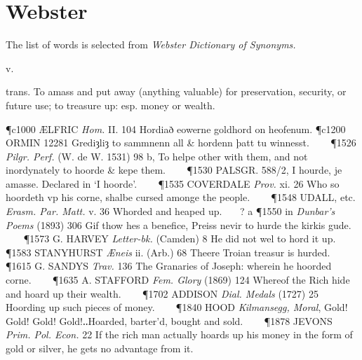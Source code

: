 \chapter*{Webster}
%


\noindent The list of words is selected from \textit{Webster Dictionary of Synonyms.}

\begin{description}[wide, labelwidth=!, labelindent=0pt] %

 v.

\noindent {}

\vspace{-0.3cm}

\begin{myenumerate}

 trans. To amass and put away (anything valuable) for preservation, security, or future use; to treasure up: esp. money or wealth.

\P c1000 ÆLFRIC  \textit{Hom.} II. 104 Hordiað eowerne goldhord on heofenum.
\P c1200 ORMIN  12281 Grediȝliȝ to sammnenn all \& hordenn þatt tu winnesst.    
\P 1526  \textit{Pilgr. Perf.} (W. de W. 1531) 98 b, To helpe other with them, and not inordynately to hoorde \& kepe them.    
\P 1530 PALSGR. 588/2, I hourde, je amasse. Declared in ‘I hoorde’.    
\P 1535 COVERDALE  \textit{Prov.} xi. 26 Who so hoordeth vp his corne, shalbe cursed amonge the people.    
\P 1548 UDALL, etc. \textit{Erasm. Par. Matt.} v. 36 Whorded and heaped up.    ? a 
\P 1550 in  \textit{Dunbar's Poems} (1893) 306 Gif thow hes a benefice, Preiss nevir to hurde the kirkis gude.    
\P 1573 G. HARVEY  \textit{Letter-bk.} (Camden) 8 He did not wel to hord it up.    
\P 1583 STANYHURST  \textit{Æneis} ii. (Arb.) 68 Theere Troian treasur is hurded.    
\P 1615 G. SANDYS  \textit{Trav.} 136 The Granaries of Joseph: wherein he hoorded corne.    
\P 1635 A. STAFFORD  \textit{Fem. Glory} (1869) 124 Whereof the Rich hide and hoard up their wealth.    
\P 1702 ADDISON  \textit{Dial. Medals} (1727) 25 Hoording up such pieces of money.    
\P 1840 HOOD  \textit{Kilmansegg, Moral}, Gold! Gold! Gold! Gold!‥Hoarded, barter'd, bought and sold.    
\P 1878 JEVONS  \textit{Prim. Pol. Econ.} 22 If the rich man actually hoards up his money in the form of gold or silver, he gets no advantage from it.


\end{myenumerate}
\end{description}
